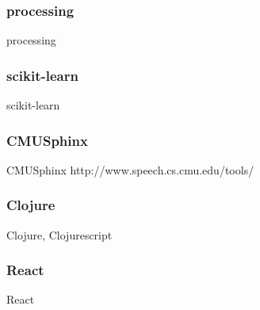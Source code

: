\subsubsection*{processing}
processing

\subsubsection*{scikit-learn}
scikit-learn

\subsubsection*{CMUSphinx}
CMUSphinx
http://www.speech.cs.cmu.edu/tools/

\subsubsection*{Clojure}
Clojure, Clojurescript

\subsubsection*{React}
React